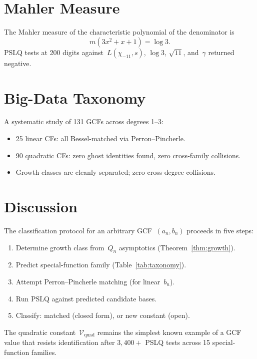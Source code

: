 \documentclass[11pt,a4paper]{article}
\begin{document}
\section{Mahler Measure}\label{sec:mahler}

The Mahler measure of the characteristic polynomial of the denominator is
\[
  m(3x^2 + x + 1) = \log 3.
\]
PSLQ tests at 200 digits against~$L(\chi_{-11}, s)$, $\log 3$, $\sqrt{11}$, and~$\gamma$ returned negative.

\section{Big-Data Taxonomy}\label{sec:bigdata}

A systematic study of 131 GCFs across degrees 1--3:
\begin{itemize}
  \item 25 linear CFs: all Bessel-matched via Perron--Pincherle.
  \item 90 quadratic CFs: zero ghost identities found, zero cross-family collisions.
  \item Growth classes are cleanly separated; zero cross-degree collisions.
\end{itemize}

\section{Discussion}\label{sec:discussion}

The classification protocol for an arbitrary GCF~$(a_n, b_n)$ proceeds in five steps:
\begin{enumerate}
  \item Determine growth class from~$Q_n$ asymptotics (Theorem~\ref{thm:growth}).
  \item Predict special-function family (Table~\ref{tab:taxonomy}).
  \item Attempt Perron--Pincherle matching (for linear~$b_n$).
  \item Run PSLQ against predicted candidate bases.
  \item Classify: matched (closed form), or new constant (open).
\end{enumerate}
The quadratic constant~$\mathcal{V}_{\mathrm{quad}}$ remains the simplest known example of a GCF value that resists identification after $3{,}400{+}$ PSLQ tests across 15 special-function families.
\end{document}
